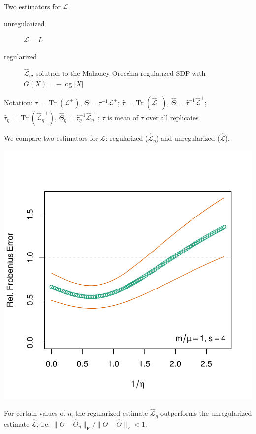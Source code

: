 \documentclass[xcolor=dvipsnames]{beamer}
\DeclareMathOperator{\Tr}{Tr}
\begin{document}
\begin{frame}
  \begin{block}{Two estimators for $\mathcal{L}$}
    \begin{description}
      \item[unregularized] $\mathcal{\hat L} = L$
      \item[regularized] $\mathcal{\hat L}_\eta$, solution to
        the Mahoney-Orecchia regularized SDP
	with $G(X) = -\log |X|$
    \end{description}

    \vspace{1em}
    Notation: 
      $\tau = \Tr(\mathcal{L}^+)$, $\Theta = \tau^{-1} \mathcal{L}^+$;
      $\hat \tau = \Tr(\mathcal{\hat L}^+)$, $\hat \Theta = \hat \tau^{-1}
\mathcal{\hat L}^+$;
      $\hat \tau_\eta = \Tr(\mathcal{\hat L_\eta}^+)$, $\hat \Theta_\eta =
\hat \tau_\eta^{-1} \mathcal{\hat L_\eta}^+$;
      $\bar \tau$ is mean of $\tau$ over all replicates
\end{block}
  We compare two estimators for $\mathcal{L}$: regularized 
  ($\mathcal{\hat L}_\eta$) and unregularized ($\mathcal{\hat L}$).
\end{frame}

\begin{frame}
	\centering
	\includegraphics[scale=0.5]{plots/estimation-frob-p100}

	For certain values of $\eta$, the regularized estimate
	$\mathcal{\hat L}_\eta$ outperforms the unregularized
	estimate $\mathcal{\hat L}$, i.e.
	$\|\Theta - \hat \Theta_\eta\|_\mathrm{F}
	   / \|\Theta - \hat \Theta\|_\mathrm{F} < 1$.
\end{frame}
\end{document}
